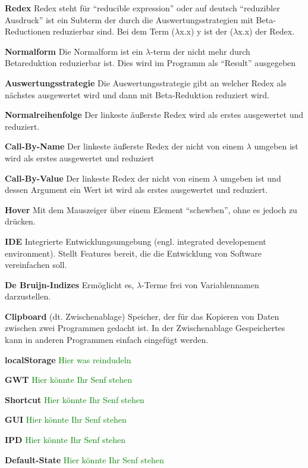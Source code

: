 \documentclass[parskip=full,11pt,twoside]{scrartcl}
\begin{document}
\textbf {Redex}
\newline
Redex steht für \enquote{reducible expression} oder auf deutsch \enquote{reduzibler Ausdruck} ist ein Subterm der durch die Auswertungsstrategien mit Beta-Reductionen reduzierbar sind.
Bei dem Term ($\lambda$x.x) y ist der ($\lambda$x.x) der Redex.

\textbf{Normalform}
\newline
Die Normalform ist ein $\lambda$-term der nicht mehr durch Betareduktion reduzierbar ist. Dies wird im Programm als \enquote{Result} ausgegeben

\textbf{Auswertungsstrategie}
\newline
Die Auswertungsstrategie gibt an welcher Redex als nächstes ausgewertet wird und dann mit Beta-Reduktion reduziert wird.

\textbf{Normalreihenfolge}
\newline
Der linkeste äußerste Redex wird als erstes ausgewertet und reduziert.

\textbf{Call-By-Name}
\newline
Der linkeste äußerste Redex der nicht von einem $\lambda$ umgeben ist wird als erstes ausgewertet und reduziert

\textbf{Call-By-Value}
\newline
Der linkeste Redex der nicht von einem $\lambda$ umgeben ist und dessen Argument ein Wert ist wird als erstes ausgewertet und reduziert.

\textbf{Hover}
\newline
Mit dem Mauszeiger über einem Element \enquote{schewben}, ohne es jedoch zu drücken.

\textbf{IDE}
\newline
Integrierte Entwicklungsumgebung (engl. integrated developement environment). Stellt Features bereit, die die Entwicklung von Software vereinfachen soll.

\textbf{De Bruijn-Indizes}
\newline
Ermöglicht es, $\lambda$-Terme frei von Variablennamen darzustellen.

\textbf{Clipboard}
\newline
(dt. Zwischenablage) Speicher, der für das Kopieren von Daten zwischen zwei Programmen gedacht ist. In der Zwischenablage Gespeichertes kann in anderen Programmen einfach eingefügt werden.

\textbf{localStorage}
\newline
\textcolor{green}{Hier was reindudeln}

\textbf{GWT}
\newline
\textcolor{green}{Hier könnte Ihr Senf stehen}

\textbf{Shortcut}
\newline
\textcolor{green}{Hier könnte Ihr Senf stehen}

\textbf{GUI}
\newline
\textcolor{green}{Hier könnte Ihr Senf stehen}

\textbf{IPD}
\newline
\textcolor{green}{Hier könnte Ihr Senf stehen}

\textbf{Default-State}
\newline
\textcolor{green}{Hier könnte Ihr Senf stehen}
\end{document}
